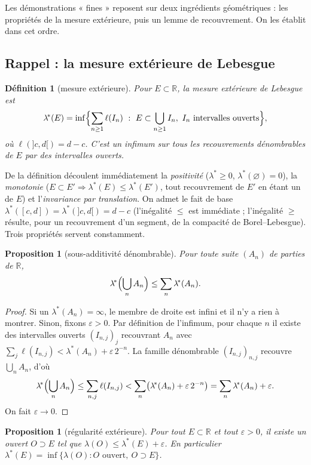 \documentclass[11pt]{article}
\theoremstyle{thmblue}
\newtheorem{proposition}[theoreme]{Proposition}
\theoremstyle{defplain}
\newtheorem{definition}[theoreme]{Définition}
\theoremstyle{rem}
\newcommand{\R}{\mathbb{R}}
\newcommand{\eps}{\varepsilon}
\newcommand{\lstar}{\lambda^{\!*}}
\begin{document}
\medskip
Les démonstrations « fines » reposent sur deux ingrédients géométriques : les propriétés de la mesure
extérieure, puis un lemme de recouvrement. On les établit dans cet ordre.

\subsection{Rappel : la mesure extérieure de Lebesgue}\label{sub:mesext}

\begin{definition}[mesure extérieure]
Pour $E\subset\R$, la \emph{mesure extérieure de Lebesgue} est
\[
\lstar(E)=\inf\Bigl\{\sum_{n\ge1}\ell(I_n)\ :\ E\subset\bigcup_{n\ge1}I_n,\ I_n\text{ intervalles ouverts}\Bigr\},
\]
où $\ell(]c,d[)=d-c$. C'est un infimum sur tous les recouvrements dénombrables de $E$ par des
intervalles ouverts.
\end{definition}

De la définition découlent immédiatement la \emph{positivité} ($\lstar\ge0$, $\lstar(\varnothing)=0$),
la \emph{monotonie} ($E\subset E'\Rightarrow\lstar(E)\le\lstar(E')$, tout recouvrement de $E'$ en étant
un de $E$) et l'\emph{invariance par translation}. On admet le fait de base
$\lstar([c,d])=\lstar(]c,d[)=d-c$ (l'inégalité $\le$ est immédiate ; l'inégalité $\ge$ résulte, pour un
recouvrement d'un segment, de la compacité de Borel--Lebesgue). Trois propriétés servent constamment.

\begin{proposition}[sous-additivité dénombrable]\label{prop:sousadd}
Pour toute suite $(A_n)$ de parties de $\R$,
\[
\lstar\Bigl(\bigcup_n A_n\Bigr)\le\sum_n\lstar(A_n).
\]
\end{proposition}

\begin{proof}
Si un $\lstar(A_n)=\infty$, le membre de droite est infini et il n'y a rien à montrer. Sinon, fixons
$\eps>0$. Par définition de l'infimum, pour chaque $n$ il existe des intervalles ouverts
$(I_{n,j})_j$ recouvrant $A_n$ avec $\sum_j\ell(I_{n,j})<\lstar(A_n)+\eps\,2^{-n}$. La famille
dénombrable $(I_{n,j})_{n,j}$ recouvre $\bigcup_n A_n$, d'où
\[
\lstar\Bigl(\bigcup_n A_n\Bigr)\le\sum_{n,j}\ell(I_{n,j})<\sum_n\bigl(\lstar(A_n)+\eps\,2^{-n}\bigr)
=\sum_n\lstar(A_n)+\eps.
\]
On fait $\eps\to0$.
\end{proof}

\begin{proposition}[régularité extérieure]\label{prop:regext}
Pour tout $E\subset\R$ et tout $\eps>0$, il existe un ouvert $O\supset E$ tel que
$\lambda(O)\le\lstar(E)+\eps$. En particulier $\lstar(E)=\inf\{\lambda(O):O\text{ ouvert},\ O\supset E\}$.
\end{proposition}
\end{document}
